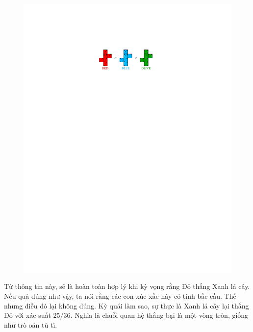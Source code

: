 \begin{multicols}{2}
\begin{figure}[H]
		\vspace*{-10pt}
		\centering
		\captionsetup{labelformat= empty, justification=centering}
		\includegraphics[scale =0.9]{3}
		\vspace*{-15pt}
	\end{figure}
	Từ thông tin này, sẽ là hoàn toàn hợp lý khi kỳ vọng rằng Đỏ thắng Xanh lá cây. Nếu quả đúng như vậy, ta nói rằng các con xúc xắc này có tính bắc cầu.
	\vskip 0.05cm
	Thế nhưng điều đó lại không đúng. Kỳ quái làm sao, sự thực là Xanh lá cây lại thắng Đỏ với xác suất $25/36$. Nghĩa là chuỗi quan hệ thắng bại là một vòng tròn, giống như trò oẳn tù tì.
	\begin{figure}[H]
		\vspace*{-10pt}
		\centering
		\captionsetup{labelformat= empty, justification=centering}

\end{figure}
\end{multicols}
